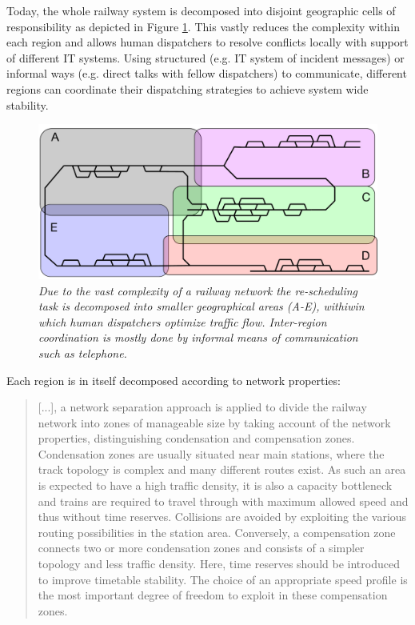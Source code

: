 \documentclass{article}
\begin{document}
Today, the whole railway system is decomposed into disjoint geographic cells of responsibility as depicted in Figure \ref{fig:geographical_decomposition}. This vastly reduces the complexity within each region and allows human dispatchers to resolve conflicts locally with support of different IT systems. Using structured (e.g. IT system of incident messages) or informal ways (e.g. direct talks with fellow dispatchers) to communicate, different regions can coordinate their dispatching strategies to achieve system wide stability.

%
\begin{figure}[hbtp]
	\centering
  \includegraphics[width=\textwidth]{Figures/disposition_areas.pdf}
	\caption{\textit{Due to the vast complexity of a railway network the re-scheduling task is decomposed into smaller geographical areas (A-E), withiwin which human dispatchers optimize traffic flow. Inter-region coordination is mostly done by informal means of communication such as telephone.} }
	\label{fig:geographical_decomposition}
\end{figure}
%

Each region is in itself decomposed according to network properties:

%
\begin{quote}
    [...], a network separation approach is applied to divide the railway network into zones of manageable size by taking account of the network properties, distinguishing condensation and compensation zones. Condensation zones are usually situated near main stations, where the track topology is complex and many different routes exist. As such an area is expected to have a high traffic density, it is also a capacity bottleneck and trains are required to travel through with maximum allowed speed and thus without time reserves. Collisions are avoided by exploiting the various routing possibilities in the station area. Conversely, a compensation zone connects two or more condensation zones and consists of a simpler topology and less traffic density. Here, time reserves should be introduced to improve timetable stability. The choice of an appropriate speed profile is the most important degree of freedom to exploit in these compensation zones. \cite{caimi2009}
\end{quote}
\end{document}
